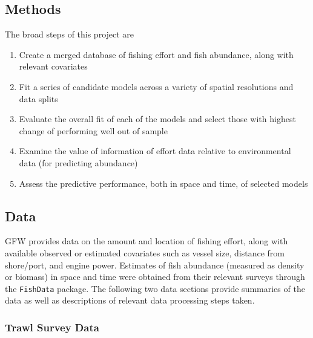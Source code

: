 \documentclass[twoside,12pt,final]{ucthesis-CA2012}
\providecommand{\tightlist}{%
  \setlength{\itemsep}{0pt}\setlength{\parskip}{0pt}}
\begin{document}
\begin{ucmainmatter}
\section{Methods}\label{methods-1}

The broad steps of this project are
\begin{enumerate}
\def\labelenumi{\arabic{enumi}.}
\tightlist
\item
  Create a merged database of fishing effort and fish abundance, along
  with relevant covariates
\item
  Fit a series of candidate models across a variety of spatial
  resolutions and data splits
\item
  Evaluate the overall fit of each of the models and select those with
  highest change of performing well out of sample
\item
  Examine the value of information of effort data relative to
  environmental data (for predicting abundance)
\item
  Assess the predictive performance, both in space and time, of selected
  models
\end{enumerate}
\subsection{Data}\label{data}

GFW provides data on the amount and location of fishing effort, along
with available observed or estimated covariates such as vessel size,
distance from shore/port, and engine power. Estimates of fish abundance
(measured as density or biomass) in space and time were obtained from
their relevant surveys through the \texttt{FishData} package. The
following two data sections provide summaries of the data as well as
descriptions of relevant data processing steps taken.

\subsubsection{Trawl Survey Data}\label{trawl-survey-data}


\end{ucmainmatter}
\end{document}
